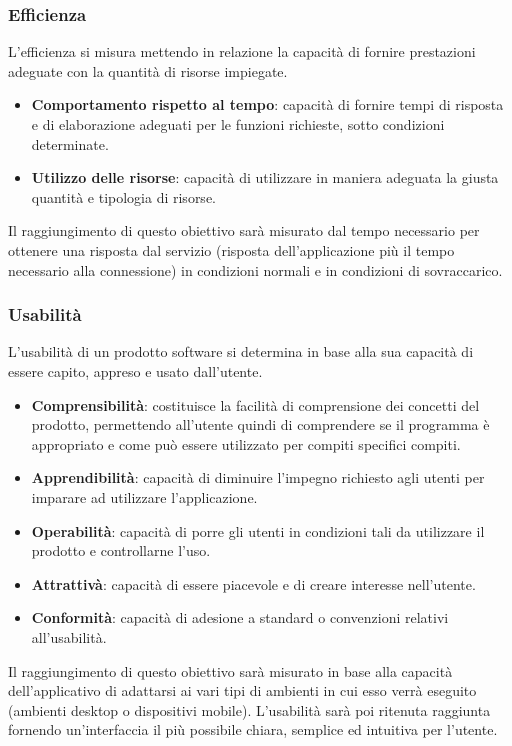 \subsubsection{Efficienza}
L'efficienza si misura mettendo in relazione la capacità di fornire prestazioni adeguate con la quantità di risorse impiegate.
\begin{itemize}
	\item \textbf{Comportamento rispetto al tempo}: capacità di fornire tempi di risposta e di elaborazione adeguati per le funzioni richieste, sotto condizioni determinate.
	\item \textbf{Utilizzo delle risorse}: capacità di utilizzare in maniera adeguata la giusta quantità e tipologia di risorse.
\end{itemize}
Il raggiungimento di questo obiettivo sarà misurato dal tempo necessario per ottenere una risposta dal servizio (risposta dell'applicazione più il tempo necessario alla connessione) in condizioni normali e in condizioni di sovraccarico.
\subsubsection{Usabilità}
L'usabilità di un prodotto software si determina in base alla sua capacità di essere capito, appreso e usato dall'utente.
\begin{itemize}
	\item \textbf{Comprensibilità}: costituisce la facilità di comprensione dei concetti del prodotto, permettendo all'utente quindi di comprendere se il programma è appropriato e come può essere utilizzato per compiti specifici compiti.
	\item \textbf{Apprendibilità}: capacità di diminuire l'impegno richiesto agli utenti per imparare ad utilizzare l'applicazione.
	\item \textbf{Operabilità}: capacità di porre gli utenti in condizioni tali da utilizzare il prodotto e controllarne l'uso.
	\item \textbf{Attrattivà}: capacità di essere piacevole e di creare interesse nell'utente.
	\item \textbf{Conformità}: capacità di adesione a standard o convenzioni	relativi all'usabilità.
\end{itemize}
Il raggiungimento di questo obiettivo sarà misurato in base alla capacità dell'applicativo di adattarsi ai vari tipi di ambienti in cui esso verrà eseguito (ambienti desktop o dispositivi mobile). L'usabilità sarà poi ritenuta raggiunta fornendo un'interfaccia il più possibile chiara, semplice ed intuitiva per l'utente.
